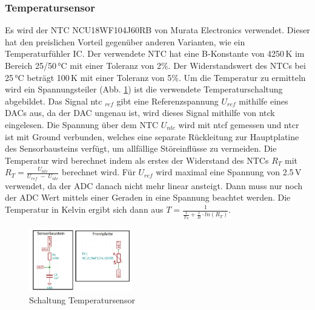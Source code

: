 \subsubsection{Temperatursensor}
Es wird der NTC NCU18WF104J60RB von Murata Electronics verwendet. Dieser hat den preislichen Vorteil gegenüber anderen Varianten, wie ein Temperaturfühler IC. Der verwendete NTC hat eine B-Konstante von 4250\,K im Bereich 25/50\,°C mit einer Toleranz von 2\%. Der Widerstandswert des NTCs bei 25\,°C beträgt 100\,K mit einer Toleranz von 5\%. Um die Temperatur zu ermitteln wird ein Spannungsteiler (Abb. \ref{pic: Temperatursensor}) ist die verwendete Temperaturschaltung abgebildet. Das Signal ntc $_{ref}$ gibt eine Referenzspannung $U_{ref}$ mithilfe eines DACs aus, da der DAC ungenau ist, wird dieses Signal mithilfe von ntck eingelesen. Die Spannung über dem NTC $U_{ntc}$ wird mit ntcf gemessen und ntcr ist mit Ground verbunden, welches eine separate Rückleitung zur Hauptplatine des Sensorbausteins verfügt, um allfällige Störeinflüsse zu vermeiden. Die Temperatur wird berechnet indem als erstes der Widerstand des NTCs $R_T$ mit $R_T = \frac{U_{ntc}}{U_{ref}\;-\;U_{ntc}}$ berechnet wird. Für $U_{ref}$ wird maximal eine Spannung von 2.5\,V verwendet, da der ADC danach nicht mehr linear ansteigt. Dann muss nur noch der ADC Wert mittels einer Geraden in eine Spannung beachtet werden. Die Temperatur in Kelvin ergibt sich dann aus $T = \frac{1}{\frac{1}{T_N}+\frac{1}{B} \cdot ln(R_T)}$.

\begin{figure}[h!]
	\centering
	\includegraphics[width=0.4\textwidth]{graphics/shematics_sensor_Temp.png}
	\caption{Schaltung Temperatursensor}
	\label{pic: Temperatursensor}
\end{figure}


